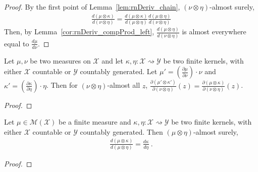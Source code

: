 \begin{proof}\leanok
{}
By the first point of Lemma~\ref{lem:rnDeriv_chain}, $(\nu \otimes \eta)$-almost surely,
\begin{align*}
\frac{d(\mu \otimes \kappa)}{d(\nu \otimes \eta)}
  = \frac{d(\mu \otimes \kappa)}{d(\mu \otimes \eta)} \frac{d (\mu \otimes \eta)}{d (\nu \otimes \eta)} 
\end{align*}
Then, by Lemma~\ref{cor:rnDeriv_compProd_left}, $\frac{d (\mu \otimes \eta)}{d (\nu \otimes \eta)}$ is almost everywhere equal to $\frac{d\mu}{d\nu}$.
\end{proof}


\begin{lemma}
  \label{lem:rnDeriv_eq_ac}
  \leanok
  Let $\mu, \nu$ be two measures on $\mathcal X$ and let $\kappa, \eta : \mathcal X \rightsquigarrow \mathcal Y$ be two finite kernels, with either $\mathcal X$ countable or $\mathcal{Y}$ countably generated.
  Let $\mu' = \left(\frac{\partial \mu}{\partial \nu}\right) \cdot \nu$ and $\kappa' = \left(\frac{\partial \kappa}{\partial \eta}\right) \cdot \eta$.
  Then for $(\nu \otimes \eta)$-almost all $z$, $\frac{\partial(\mu' \otimes \kappa')}{\partial (\nu \otimes \eta)}(z) = \frac{\partial(\mu \otimes \kappa)}{\partial (\nu \otimes \eta)}(z)$.
\end{lemma}

\begin{proof} \leanok
\end{proof}


\begin{lemma}
  \label{cor:rnDeriv_compProd_right}
  \leanok
  Let $\mu \in \mathcal M(\mathcal X)$ be a finite measure and $\kappa, \eta : \mathcal X \rightsquigarrow \mathcal Y$ be two finite kernels, with either $\mathcal X$ countable or $\mathcal{Y}$ countably generated.
  Then $(\mu \otimes \eta)$-almost surely,
  \begin{align*}
  \frac{d (\mu \otimes \kappa)}{d (\mu \otimes \eta)} = \frac{d \kappa}{d \eta}
  \: .
  \end{align*}
\end{lemma}

\begin{proof}\leanok
{}

\end{proof}

